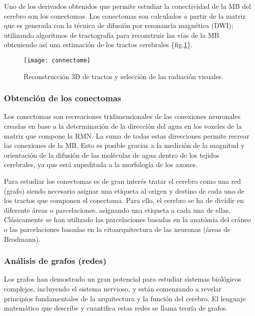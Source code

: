 \documentclass[fleqn,10pt]{UICArticle} %
\begin{document}
 Uno de los derivados obtenidos que permite estudiar la conectividad de la MB del cerebro son los conectomas. Los conectomas son calculados a partir de la matriz que es generada con la técnica de difusión por resonancia magnética (DWI); utilizando algoritmos de tractografía para reconstruir las vías de la MB obteniendo así una estimación de los tractos cerebrales \{fig.\ref{fig:connectome}\}.

\begin{figure}[h]
	\centering
	\texttt{[image: connectome]}
	\caption{Reconstrucción 3D de tractos y selección de las radiación visuales.}
	\label{fig:connectome}
\end{figure}

\subsubsection{Obtención de los conectomas}
Los conectomas son recreaciones tridimensionales de las conexiones neuronales creadas en base a la determinación de la dirección del agua en los voxeles de la matriz que compone la RMN. La suma de todas estas direcciones permite recrear las conexiones de la MB. Esto es posible gracias a la medición de la magnitud y orientación de la difusión de las moléculas de agua dentro de los tejidos cerebrales, ya que está supeditada a la morfología de los axones.

Para estudiar los conectomas es de gran interés tratar el cerebro como una red (grafo) \cite{Fornito} siendo necesario asignar una etiqueta al origen y destino de cada uno de los tractos que componen el conectoma. Para ello, el cerebro se ha de dividir en diferente áreas o parcelaciones, asignando una etiqueta a cada una de ellas. Clásicamente se han utilizado las parcelaciones basadas en la anatómia del cráneo o las parcelaciones basadas en la citoarquitectura de las neuronas (áreas de Brodmann).



\subsubsection{Análisis de grafos (redes)}

Los grafos han demostrado un gran potencial para estudiar sistemas biológicos complejos, incluyendo el sistema nervioso, y están comenzando a revelar principios fundamentales de la arquitectura y la función del cerebro. El lenguaje matemático que describe y cuantifica estas redes se llama teoría de grafos.
 
\end{document}
